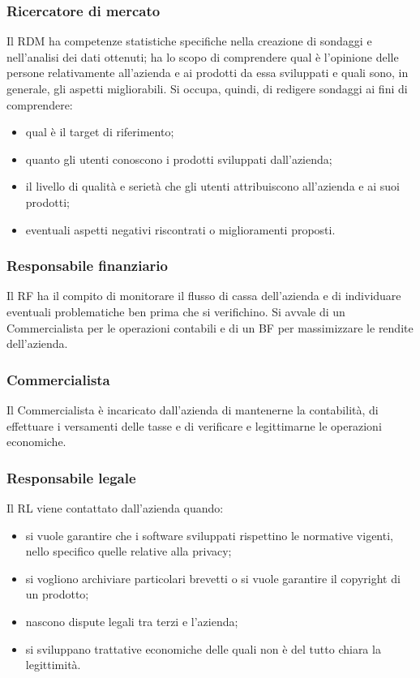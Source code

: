 \subsubsection{Ricercatore di mercato}
Il RDM ha competenze statistiche specifiche nella creazione di sondaggi e nell\textquoteright{}analisi
dei dati ottenuti; ha lo scopo di comprendere qual \`{e} l\textquoteright{}opinione delle persone relativamente
all\textquoteright{}azienda e ai prodotti da essa sviluppati e quali sono, in generale, gli aspetti
migliorabili. Si occupa, quindi, di redigere sondaggi ai fini di comprendere:
\begin{itemize}
\item qual \`{e} il target di riferimento;
\item quanto gli utenti conoscono i prodotti sviluppati dall\textquoteright{}azienda;
\item il livello di qualit\`{a} e seriet\`{a} che gli utenti attribuiscono all\textquoteright{}azienda e ai suoi
prodotti;
\item eventuali aspetti negativi riscontrati o miglioramenti proposti.
\end{itemize}

\subsubsection{Responsabile finanziario}
Il RF ha il compito di monitorare il flusso di cassa dell\textquoteright{}azienda e di individuare eventuali
problematiche ben prima che si verifichino. Si avvale di un Commercialista per le
operazioni contabili e di un BF per massimizzare le rendite dell\textquoteright{}azienda.

\subsubsection{Commercialista}
Il Commercialista \`{e} incaricato dall\textquoteright{}azienda di mantenerne la contabilit\`{a}, di effettuare i
versamenti delle tasse e di verificare e legittimarne le operazioni economiche.

\subsubsection{Responsabile legale}
Il RL viene contattato dall\textquoteright{}azienda quando:
\begin{itemize}
\item si vuole garantire che i software sviluppati rispettino le normative vigenti, nello
specifico quelle relative alla privacy;
\item si vogliono archiviare particolari brevetti o si vuole garantire il copyright di un
prodotto;
\item nascono dispute legali tra terzi e l\textquoteright{}azienda;
\item si sviluppano trattative economiche delle quali non \`{e} del tutto chiara la legittimit\`{a}.
\end{itemize}
